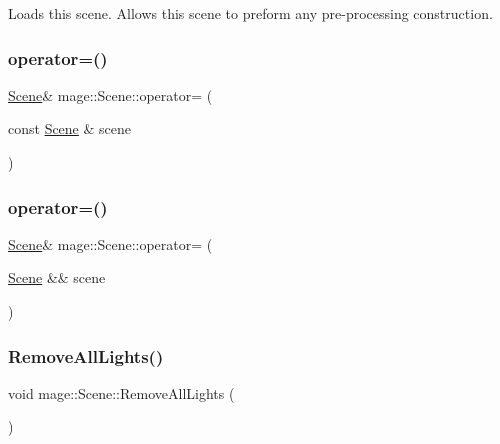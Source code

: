 Loads this scene. Allows this scene to preform any pre-\/processing construction. \hypertarget{classmage_1_1_scene_a2c25c0fedc0230771d8c00a8288a69ce}{}\label{classmage_1_1_scene_a2c25c0fedc0230771d8c00a8288a69ce} 
\subsubsection{\texorpdfstring{operator=()}{operator=()}\hspace{0.1cm}{\footnotesize\ttfamily [1/2]}}
{\footnotesize\ttfamily \hyperlink{classmage_1_1_scene}{Scene}\& mage\+::\+Scene\+::operator= (\begin{DoxyParamCaption}\item[{const \hyperlink{classmage_1_1_scene}{Scene} \&}]{scene }\end{DoxyParamCaption})\hspace{0.3cm}{\ttfamily [delete]}}

\hypertarget{classmage_1_1_scene_a400926762670c9cd9b6d456291600f53}{}\label{classmage_1_1_scene_a400926762670c9cd9b6d456291600f53} 
\subsubsection{\texorpdfstring{operator=()}{operator=()}\hspace{0.1cm}{\footnotesize\ttfamily [2/2]}}
{\footnotesize\ttfamily \hyperlink{classmage_1_1_scene}{Scene}\& mage\+::\+Scene\+::operator= (\begin{DoxyParamCaption}\item[{\hyperlink{classmage_1_1_scene}{Scene} \&\&}]{scene }\end{DoxyParamCaption})\hspace{0.3cm}{\ttfamily [delete]}}

\hypertarget{classmage_1_1_scene_acde7e343459ea1444f2b0f7bbb3e1882}{}\label{classmage_1_1_scene_acde7e343459ea1444f2b0f7bbb3e1882} 
\subsubsection{\texorpdfstring{Remove\+All\+Lights()}{RemoveAllLights()}}
{\footnotesize\ttfamily void mage\+::\+Scene\+::\+Remove\+All\+Lights (\begin{DoxyParamCaption}{ }\end{DoxyParamCaption})\hspace{0.3cm}{\ttfamily [private]}}

